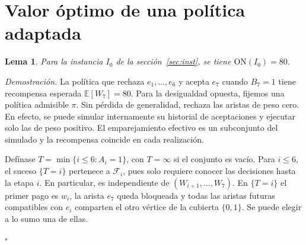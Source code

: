\documentclass[11pt,a4paper]{article}
\newcommand{\E}{\mathbb{E}}
\newtheorem{lema}{Lema}
\newenvironment{prueba}[1][Demostración]{\par\smallskip\noindent\textit{#1.}\enspace}{\unskip\nobreak\hfill\(\square\)\par\smallskip}
\newcommand{\ON}{\mathrm{ON}}
\newcommand{\F}{\mathcal F}
\begin{document}
\clearpage
\section{Valor óptimo de una política adaptada}
\begin{lema}\label{lem:on}
Para la instancia \(I_0\) de la sección~\ref{sec:inst}, se tiene \(\ON(I_0)=80\).
\end{lema}
\begin{prueba}
La política que rechaza \(e_1,\ldots,e_6\) y acepta \(e_7\) cuando \(B_7=1\) tiene recompensa esperada \(\E[W_7]=80\). Para la desigualdad opuesta, fijemos una política admisible \(\pi\). Sin pérdida de generalidad, rechaza las aristas de peso cero. En efecto, se puede simular internamente su historial de aceptaciones y ejecutar solo las de peso positivo. El emparejamiento efectivo es un subconjunto del simulado y la recompensa coincide en cada realización.

Defínase \(T=\min\{i\leq6:A_i=1\}\), con \(T=\infty\) si el conjunto es vacío. Para \(i\leq6\), el suceso \(\{T=i\}\) pertenece a \(\F_i\), pues solo requiere conocer las decisiones hasta la etapa \(i\). En particular, es independiente de \((W_{i+1},\ldots,W_7)\). En \(\{T=i\}\) el primer pago es \(w_i\), la arista \(e_7\) queda bloqueada y todas las aristas futuras compatibles con \(e_i\) comparten el otro vértice de la cubierta \(\{0,1\}\). Se puede elegir a lo sumo una de ellas.


\end{prueba}
\end{document}
